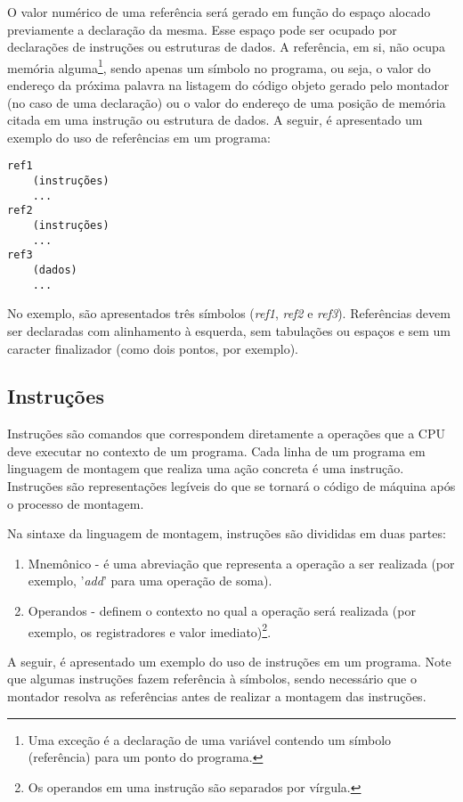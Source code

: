 \documentclass[11pt,a4paper]{report}
\begin{document}
O valor numérico de uma referência será gerado em função do espaço alocado
previamente a declaração da mesma. Esse espaço pode ser ocupado por
declarações de instruções ou estruturas de dados. A referência, em si,
não ocupa memória alguma\footnote{Uma exceção é a declaração de uma
variável contendo um símbolo (referência) para um ponto do programa.},
sendo apenas um símbolo no programa, ou seja, o valor do endereço
da próxima palavra na listagem do código objeto gerado pelo montador (no
caso de uma declaração) ou o valor do endereço de uma posição de memória
citada em uma instrução ou estrutura de dados. A seguir, é apresentado
um exemplo do uso de referências em um programa:

\begin{verbatim}
ref1
    (instruções)
    ...
ref2
    (instruções)
    ...
ref3
    (dados)
    ...
\end{verbatim}

No exemplo, são apresentados três símbolos (\textit{ref1}, \textit{ref2}
e \textit{ref3}). Referências devem ser declaradas com alinhamento à 
esquerda, sem tabulações ou espaços e sem um caracter finalizador (como
dois pontos, por exemplo).

\subsection{Instruções}

Instruções são comandos que correspondem diretamente a operações que a
CPU deve executar no contexto de um programa. Cada linha de um programa
em linguagem de montagem que realiza uma ação concreta é uma instrução.
Instruções são representações legíveis do que se tornará o código de
máquina após o processo de montagem.

Na sintaxe da linguagem de montagem, instruções são divididas em duas
partes:

\begin{enumerate}
\item Mnemônico - é uma abreviação que representa a operação a ser
realizada (por exemplo, '\textit{add}' para uma operação de soma).
\item Operandos - definem o contexto no qual a operação será realizada
(por exemplo, os registradores e valor imediato)\footnote{Os operandos
em uma instrução são separados por vírgula.}.
\end{enumerate}

A seguir, é apresentado um exemplo do uso de instruções em um programa.
Note que algumas instruções fazem referência à símbolos, sendo necessário
que o montador resolva as referências antes de realizar a montagem das
instruções.
\end{document}
